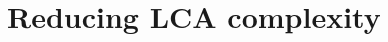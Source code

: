 \documentclass[10pt,journal,draftclsnofoot,onecolumn]{IEEEtran}
\renewcommand\vec[1]{\boldsymbol{#1}}
\newcommand\1{\vec 1}
\begin{document}
% 

% 
% 
% 





\appendices

\section{Reducing LCA complexity}

\renewcommand\b{\vec b}
\end{document}
